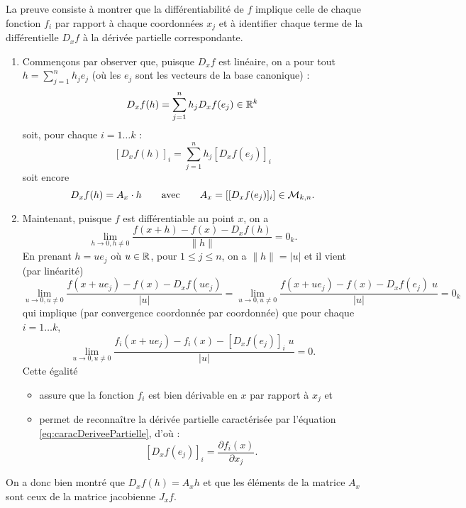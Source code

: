 \proof
La preuve consiste à montrer que la différentiabilité de $f$ implique celle de chaque fonction $f_i$ par rapport à chaque coordonnées $x_j$ et à identifier chaque terme de la différentielle $D_xf$ à la dérivée partielle correspondante. 
\begin{enumerate}
  \item Commençons par observer que, puisque $D_x f$ est linéaire, on a pour tout $h = \sum_{j=1}^n h_j e_j$ (où les $e_j$ sont les vecteurs de la base canonique) :
  $$
  D_xf(h) = \sum_{j=1}^n h_j D_xf(e_j) \in \mathbb{R}^k
  $$
  soit, pour chaque $i = 1 \dots k$ :
  $$
  [D_xf(h)]_i = \sum_{j=1}^n h_j [D_xf(e_j)]_i
  $$
  soit encore
  $$
  D_xf(h) = A_x \cdot h
  \qquad \text{avec} \qquad
  A_x = \left[ [D_xf(e_j)]_i \right] \in \mathcal{M}_{k, n}.
  $$
  \item Maintenant, puisque $f$ est différentiable au point $x$, on a 
  $$
  \lim_{h\to 0, h \neq 0} \frac{f(x+h) - f(x) - D_xf(h)}{\|h\|} = 0_k.
  $$
  En prenant $h = u e_j$ où $u \in \mathbb{R}$, pour $1 \leq j \leq n$, on a $\|h\| = |u|$ et il vient (par linéarité)
  $$
  \lim_{u\to 0, u \neq 0} \frac{f(x+u e_j) - f(x) - D_xf(u e_j)}{|u|} 
  = \lim_{u\to 0, u \neq 0} \frac{f(x+u e_j) - f(x) - D_xf(e_j) \; u}{|u|} 
  =  0_k
  $$
  qui implique (par convergence coordonnée par coordonnée) que pour chaque $i = 1 \dots k$, 
  $$
  \lim_{u\to 0, u \neq 0} \frac{f_i(x+u e_j) - f_i(x) - [D_xf(e_j)]_i \; u}{|u|} 
  = 0.
  $$
  Cette égalité 
  \begin{itemize}
   \item assure que la fonction $f_i$ est bien dérivable en $x$ par rapport à $x_j$ et 
   \item permet de reconnaître la dérivée partielle caractérisée par l'équation \eqref{eq:caracDeriveePartielle}, d'où : 
   $$
   [D_xf(e_j)]_i = \frac{\partial f_i(x)}{\partial x_j}.
   $$
  \end{itemize}
\end{enumerate}
On a donc bien montré que $D_xf(h) = A_x h$ et que les éléments de la matrice $A_x$ sont ceux de la matrice jacobienne $J_xf$.
\eproof


